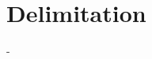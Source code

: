 \section{Delimitation}
-

\iffalse
Avgränsningar: (slids)

Avgränsningarna ska ta upp vilka delar av det övergripande syftet som inte tas upp i arbetet, och anledningarna till detta. (Kan ingå i problem-/uppgiftsanalysen)
\fi
